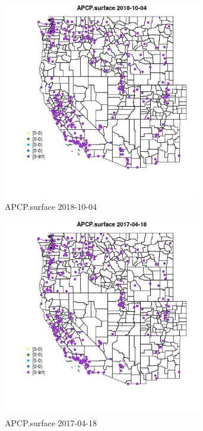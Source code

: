 \begin{figure} 
\centering  
\includegraphics[width=0.77\textwidth]{Code_Outputs/Report_ML_input_PM25_Step4_part_f_de_duplicated_aveswNAs_MapObsAPCPsurface2018-10-04.jpg} 
\caption{\label{fig:Report_ML_input_PM25_Step4_part_f_de_duplicated_aveswNAsMapObsAPCPsurface2018-10-04}APCP.surface 2018-10-04} 
\end{figure} 
 

\clearpage 

\begin{figure} 
\centering  
\includegraphics[width=0.77\textwidth]{Code_Outputs/Report_ML_input_PM25_Step4_part_f_de_duplicated_aveswNAs_MapObsAPCPsurface2017-04-18.jpg} 
\caption{\label{fig:Report_ML_input_PM25_Step4_part_f_de_duplicated_aveswNAsMapObsAPCPsurface2017-04-18}APCP.surface 2017-04-18} 
\end{figure} 
 

